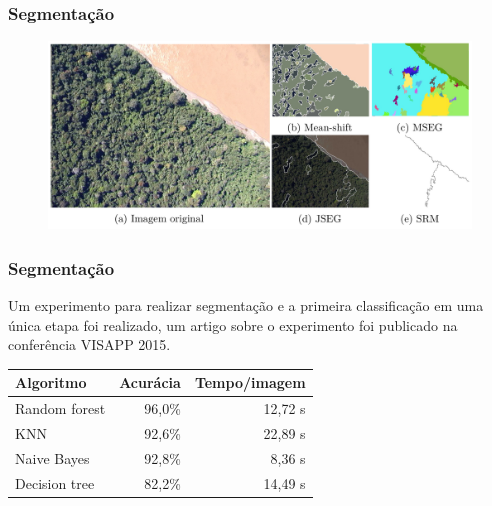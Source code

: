 \documentclass[t]{beamer}
\begin{document}
\begin{frame}[c]
	\frametitle{Segmentação}

	\begin{figure}[c]
		\centering
		\includegraphics[width=\textwidth]{imgs/gambi_apresentacao2}
	\end{figure}

\end{frame}

\begin{frame}
	\frametitle{Segmentação}

	Um experimento para realizar segmentação e a primeira classificação em uma única etapa foi realizado, um artigo sobre o experimento foi publicado  na conferência VISAPP 2015. 

	\small{
	\begin{table}
	\centering
	\begin{tabulary}{\linewidth}{|L|R|R|}
		\hline
		\textbf{Algoritmo} & \textbf{Acurácia} & \textbf{Tempo/imagem} \\ \hline
		Random forest  & 96,0\% & 12,72 s \\ \hline
		KNN            & 92,6\% & 22,89 s \\ \hline
		Naive Bayes    & 92,8\% & 8,36 s \\ \hline
		Decision tree  & 82,2\% & 14,49 s \\ \hline
	\end{tabulary}
	\end{table}
	}

\end{frame}
\end{document}
